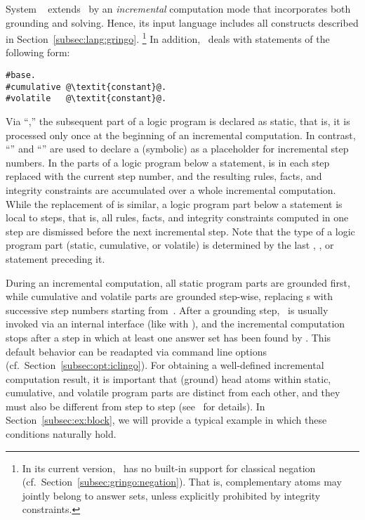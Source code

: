 System \iclingo~\cite{gekakaosscth08a} extends \clingo\ by an
\emph{incremental} computation mode that incorporates both grounding and solving.
Hence, its input language includes all constructs described
in Section~\ref{subsec:lang:gringo}.%
\footnote{%
  In its current version, \iclingo\ has no built-in support for
  classical negation (cf.\ Section~\ref{subsec:gringo:negation}).
  That is, complementary atoms may jointly belong to answer sets,
  unless explicitly prohibited by integrity constraints.}
In addition, \iclingo\ deals with statements of the following form:
%
\begin{lstlisting}[numbers=none,escapechar=@]
#base.
#cumulative @\textit{constant}@.
#volatile   @\textit{constant}@.
\end{lstlisting}
%
Via ``,''
the subsequent part of a logic program is declared as static, that is,
it is processed only once at the beginning of an incremental computation.
In contrast, ``''
and ``'' are used to declare
a (symbolic)  as a placeholder for incremental step numbers.
In the parts of a logic program below a  statement,
 is in each step replaced with the current step number,
and the resulting rules, facts, and integrity constraints are accumulated
over a whole incremental computation.
While the replacement of  is similar,
a logic program part below a  statement is local to steps,
that is, all rules, facts, and integrity constraints computed in one step
are dismissed before the next incremental step.
Note that the type of a logic program part (static, cumulative, or volatile)
is determined by the last
, , or  statement
preceding it.

During an incremental computation, all static program parts are grounded first,
while cumulative and volatile parts are grounded step-wise,
replacing s with successive step numbers starting from~.
After a grounding step, \clasp\ is usually invoked via an internal interface
(like with \clingo), and the incremental computation stops after a step
in which at least one answer set has been found by \clasp.
This default behavior can be readapted via command line 
options (cf.\ Section~\ref{subsec:opt:iclingo}).
For obtaining a well-defined incremental computation result,
it is important that (ground) head atoms within static, cumulative, and volatile program parts
are distinct from each other, and they must also be different from step to step
(see~\cite{gekakaosscth08a} for details).
In Section~\ref{subsec:ex:block},
we will provide a typical example in which these conditions naturally hold.

